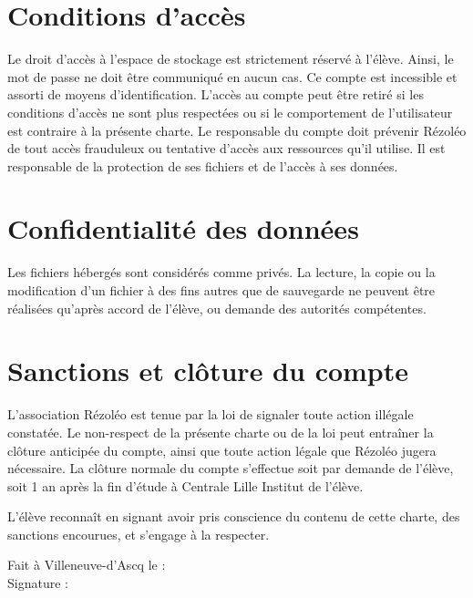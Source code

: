 \documentclass[11pt, a4paper]{article}
\begin{document}
\section{Conditions d'accès}
Le droit d'accès à l'espace de stockage est strictement réservé à l'élève. Ainsi, le mot de passe ne doit être communiqué en aucun cas. Ce compte est incessible et assorti de moyens d'identification. L'accès au compte peut être retiré si les conditions d'accès ne sont plus respectées ou si le comportement de l'utilisateur est contraire à la présente charte. Le responsable du compte doit prévenir Rézoléo de tout accès frauduleux ou tentative d'accès aux ressources qu'il utilise. Il est responsable de la protection de ses fichiers et de l'accès à ses données.

\section{Confidentialité des données}
Les fichiers hébergés sont considérés comme privés. La lecture, la copie ou la modification d'un fichier à des fins autres que de sauvegarde ne peuvent être réalisées qu'après accord de l'élève, ou demande des autorités compétentes.

\section{Sanctions et clôture du compte}
L'association Rézoléo est tenue par la loi de signaler toute action illégale constatée. Le non-respect de la présente charte ou de la loi peut entraîner la clôture anticipée du compte, ainsi que toute action légale que Rézoléo jugera nécessaire.
La clôture normale du compte s'effectue soit par demande de l'élève, soit 1 an après la fin d'étude à Centrale Lille Institut de l'élève.

\vspace*{2cm}

\noindent L'élève reconnaît en signant avoir pris conscience du contenu de cette charte, des sanctions encourues, et s'engage à la respecter.

\vspace*{0.5cm}

\begin{flushright}
	\begin{minipage}{0.5\linewidth}
		Fait à Villeneuve-d'Ascq le : \dotfill\\
		Signature :
	\end{minipage}
\end{flushright}
\end{document}
